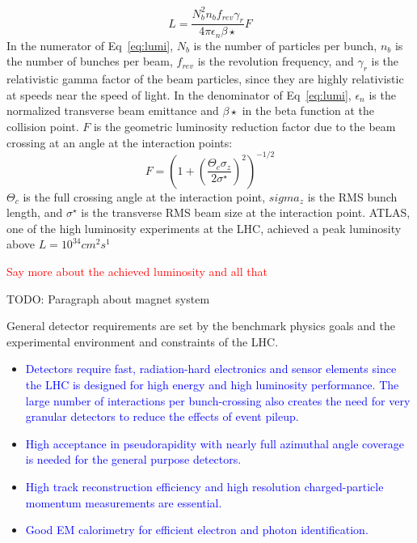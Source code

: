 \begin{equation}
L=\frac{N_b^2n_bf_{rev}\gamma_r}{4\pi\epsilon_n\beta\star}F
\label{eq:lumi}
\end{equation}
In the numerator of Eq~\ref{eq:lumi}, $N_b$ is the number of particles per bunch, $n_b$ is the number of bunches per beam, $f_{rev}$ is the revolution frequency, and $\gamma_r$ is the relativistic gamma factor of the beam particles, since they are highly relativistic at speeds near the speed of light.  In the denominator of Eq~\ref{eq:lumi}, $\epsilon_n$ is the normalized transverse beam emittance and $\beta\star$ in the beta function at the collision point.  $F$ is the geometric luminosity reduction factor due to the beam crossing at an angle at the interaction points:
\begin{equation}
F=(1+(\frac{\Theta_c\sigma_z}{2\sigma^{\star}})^2)^{-1/2}
\label{eq:reduction}
\end{equation}
$\Theta_c$ is the full crossing angle at the interaction point, $sigma_z$ is the RMS bunch length, and $\sigma^{\star}$ is the transverse RMS beam size at the interaction point.  ATLAS, one of the high luminosity experiments at the LHC, achieved a peak luminosity above $L=10^{34}cm^2s^1$

\textcolor{red}{Say more about the achieved luminosity and all that}
 
TODO: Paragraph about magnet system	

General detector requirements are set by the benchmark physics goals and the experimental environment and constraints of the LHC.  
\begin{itemize}
\item \textcolor{blue}{Detectors require fast, radiation-hard electronics and sensor elements since the LHC is designed for high energy and high luminosity performance.  The large number of interactions per bunch-crossing also creates the need for very granular detectors to reduce the effects of event pileup.}
\item \textcolor{blue}{High acceptance in pseudorapidity with nearly full azimuthal angle coverage is needed for the general purpose detectors.}
\item \textcolor{blue}{High track reconstruction efficiency and high resolution charged-particle momentum measurements are essential.}
\item \textcolor{blue}{Good EM calorimetry for efficient electron and photon identification.}
\end{itemize}
 
